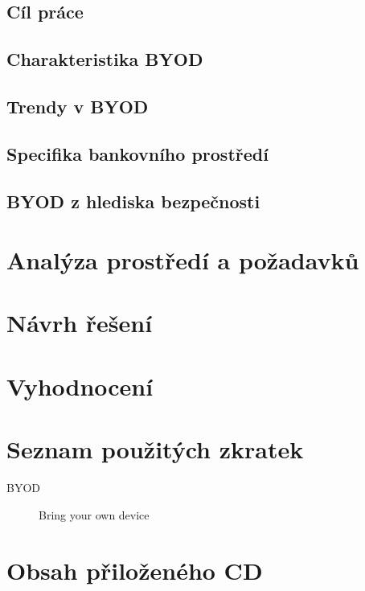 \documentclass[thesis=M,czech]{FITthesis}[2012/06/26]
\begin{document}
\section{Cíl práce}

\section{Charakteristika BYOD}
\section{Trendy v BYOD} 
\section{Specifika bankovního prostředí}
\section{BYOD z hlediska bezpečnosti}
 


\chapter{Analýza prostředí a požadavků}
 


\chapter{Návrh řešení}
  

\chapter{Vyhodnocení}

\begin{conclusion}
	
\end{conclusion}




\appendix

\chapter{Seznam použitých zkratek}
\begin{description}
	\item[BYOD] Bring your own device
\end{description}




\chapter{Obsah přiloženého CD}
 
\end{document}
